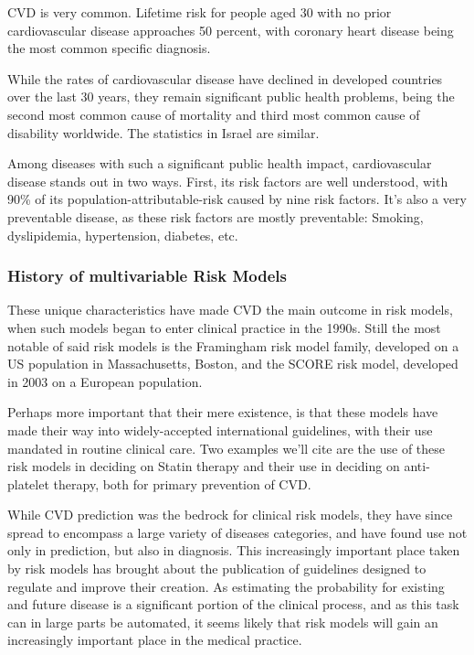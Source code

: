 \documentclass[a4paper,12pt]{article}
\begin{document}
			CVD is very common. Lifetime risk for people aged 30 with no prior cardiovascular disease approaches 50 percent\cite{Rapsomaniki2014}, with coronary heart disease being the most common specific diagnosis\cite{Benjamin2017}.
			
			While the rates of cardiovascular disease have declined in developed countries over the last 30 years\cite{Koton2014,Vangen-Loenne2017}, they remain significant public health problems, being the second most common cause of mortality and third most common cause of disability worldwide\cite{Lozano2012}. The statistics in Israel are similar\cite{ICDC2017}.
			
			Among diseases with such a significant public health impact, cardiovascular disease stands out in two ways. First, its risk factors are well understood, with 90\% of its population-attributable-risk caused by nine risk factors. It's also a very preventable disease, as these risk factors are mostly preventable\cite{Yusuf2004,ODonnell2016}: Smoking, dyslipidemia, hypertension, diabetes, etc.
			
			\subsubsection{History of multivariable Risk Models}
			
			These unique characteristics have made CVD the main outcome in risk models, when such models began to enter clinical practice in the 1990s\cite{Wilson1998,NationalCholesterolEducationProgramNCEPExpertPanelonDetection2002,Conroy2003,Hippisley-Cox2007,DAgostino2008,Hippisley-Cox2008,Goff2014}. Still the most notable of said risk models is the Framingham risk model family, developed on a US population in Massachusetts, Boston\cite{Wilson1998}, and the SCORE risk model, developed in 2003 on a European population\cite{Conroy2003}.
			
			Perhaps more important that their mere existence, is that these models have made their way into widely-accepted international guidelines, with their use mandated in routine clinical care. Two examples we'll cite are the use of these risk models in deciding on Statin therapy\cite{Goff2014} and their use in deciding on anti-platelet therapy\cite{Bibbins-Domingo2016}, both for primary prevention of CVD.
			
			While CVD prediction was the bedrock for clinical risk models, they have since spread to encompass a large variety of diseases categories\cite{Kanis2008,Kansagara2011}, and have found use not only in prediction, but also in diagnosis\cite{Usher-Smith2016}. This increasingly important place taken by risk models has brought about the publication of guidelines designed to regulate and improve their creation\cite{Collins2015}. As estimating the probability for existing and future disease is a significant portion of the clinical process\cite{Moons2009}, and as this task can in large parts be automated, it seems likely that risk models will gain an increasingly important place in the medical practice.
			
\end{document}
